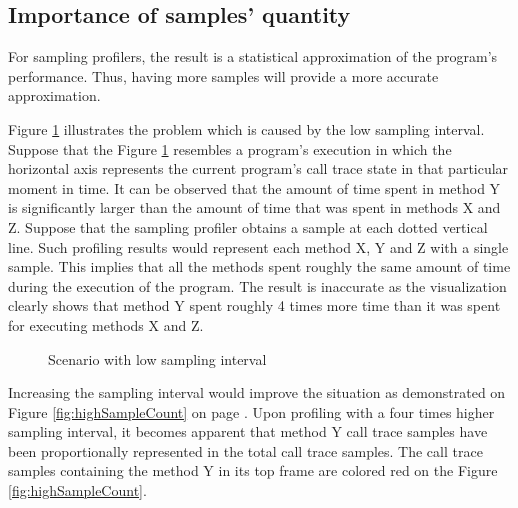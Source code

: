 \documentclass[..thesis.tex]{subfiles}
\begin{document}
\subsection{Importance of samples' quantity}

For sampling profilers, the result is a statistical approximation of the program's performance. Thus, having more samples will provide a more accurate approximation. 

Figure \ref{fig:lowSampleCount} illustrates the problem which is caused by the low sampling interval. Suppose that the Figure \ref{fig:lowSampleCount} resembles a program's execution in which the horizontal axis represents the current program's call trace state in that particular moment in time. It can be observed that the amount of time spent in method Y is significantly larger than the amount of time that was spent in methods X and Z. Suppose that the sampling profiler obtains a sample at each dotted vertical line. Such profiling results would represent each method X, Y and Z with a single sample. This implies that all the methods spent roughly the same amount of time during the execution of the program. The result is inaccurate as the visualization clearly shows that method Y spent roughly 4 times more time than it was spent for executing methods X and Z.

\begin{figure}[H]
\centering
{}
\caption{Scenario with low sampling interval}
\label{fig:lowSampleCount}
\end{figure}

Increasing the sampling interval would improve the situation as demonstrated on Figure \ref{fig:highSampleCount} on page \pageref{fig:highSampleCount}. Upon profiling with a four times higher sampling interval, it becomes apparent that method Y call trace samples have been proportionally represented in the total call trace samples. The call trace samples containing the method Y in its top frame are colored red on the Figure \ref{fig:highSampleCount}.
\end{document}
